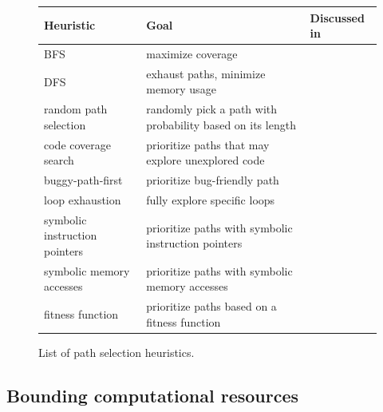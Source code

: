 \begin{figure}[t]
  \centering
  \begin{adjustbox}{width=1\columnwidth}
  \begin{small}
  \begin{tabular}{| l || l || l |}
    \hline      
    Heuristic & Goal & Discussed in \\ \hline\hline
    BFS & maximize coverage & \cite{CKC-TOCS12,PEX-TAP08} \\
    DFS & exhaust paths, minimize memory usage & \cite{EXE-CCS06,CKC-TOCS12,PEX-TAP08,DART-PLDI05} \\
    random path selection & randomly pick a path with probability based on its length & \cite{KLEE-OSDI08} \\
    code coverage search & prioritize paths that may explore unexplored code & \cite{EXE-CCS06,KLEE-OSDI08,MAYHEM-SP12,CKC-TOCS12,GV-ISSTA02} \\
    buggy-path-first & prioritize bug-friendly path  & \cite{AEG-NDSS11} \\
    loop exhaustion & fully explore specific loops  & \cite{AEG-NDSS11} \\
    symbolic instruction pointers & prioritize paths with symbolic instruction pointers & \cite{MAYHEM-SP12} \\
    symbolic memory accesses & prioritize paths with symbolic memory accesses & \cite{MAYHEM-SP12} \\ 
    fitness function & prioritize paths based on a fitness function & \cite{XTD-DSN09,CS-CACM13,XTD-DSN09} \\
    
    \hline  
  \end{tabular}
  \end{small}
  \end{adjustbox}
  \caption{List of path selection heuristics.}
  \label{tab:heuristics}
\end{figure}


\subsection{Bounding computational resources}
\label{heuristics}

